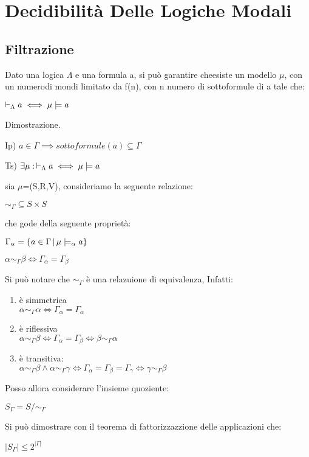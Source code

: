%

\chapter{Decidibilità Delle Logiche Modali}


\section{Filtrazione}

Dato una logica $\Lambda$ e una formula a, si può garantire cheesiste
un modello $\mu$, con un numerodi mondi limitato da f(n), con n numero
di sottoformule di a tale che:

$\vdash_{\Lambda}a\iff\mu\models a$

Dimostrazione.

Ip) $a\in\Gamma\implies sottoformule(a)\subseteq\Gamma$

Ts) $\exists\mu:\,\vdash_{\Lambda}a\iff\mu\models a$

sia $\mu$=(S,R,V), consideriamo la seguente relazione:

$\sim_{\Gamma}\subseteq S\times S$

che gode della seguente proprietà:

$\Gamma_{\alpha}=\{a\in\Gamma\,|\,\mu\models_{\alpha}a\}$

$\alpha\sim_{\Gamma}\beta\iff\Gamma_{\alpha}=\Gamma_{\beta}$

Si può notare che $\sim_{\Gamma}$ è una relazuione di equivalenza,
Infatti:
\begin{enumerate}
\item è simmetrica\\
$\alpha\sim_{\Gamma}\alpha\iff\Gamma_{\alpha}=\Gamma_{\alpha}$
\item è riflessiva\\
$\alpha\sim_{\Gamma}\beta\iff\Gamma_{\alpha}=\Gamma_{\beta}\iff\beta\sim_{\Gamma}\alpha$
\item è transitiva:\\
$\alpha\sim_{\Gamma}\beta\wedge\alpha\sim_{\Gamma}\gamma\iff\Gamma_{\alpha}=\Gamma_{\beta}=\Gamma_{\gamma}\iff\gamma\sim_{\Gamma}\beta$
\end{enumerate}
Posso allora considerare l'insieme quoziente:

$S_{\Gamma}=S/\sim_{\Gamma}$

Si può dimostrare con il teorema di fattorizzazzione delle applicazioni
che:

$|S_{\Gamma}|\leq2^{|\Gamma|}$

